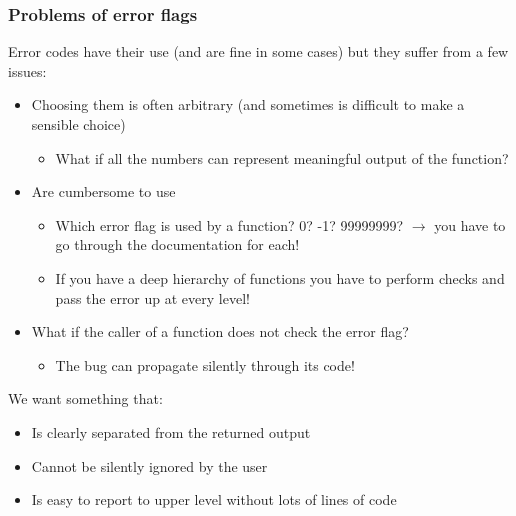 \documentclass[9pt]{beamer}
\begin{document}
\begin{frame}
  \frametitle{Problems of error flags}
  
    Error codes have their use (and are fine in some cases) but they suffer from a few issues:
    \begin{itemize}
      \item Choosing them is often arbitrary (and sometimes is difficult to make a sensible choice)
      \begin{itemize}
        \item What if all the numbers can represent meaningful output of the function?
      \end{itemize}
      \item Are cumbersome to use
      \begin{itemize}
        \item Which error flag is used by a function? 0? -1? 99999999? $\rightarrow$ you have to go through the documentation for each!
        \item If you have a deep hierarchy of functions you have to perform checks and pass the error up at every level!
      \end{itemize}
      \item What if the caller of a function does not check the error flag?
      \begin{itemize}
        \item The bug can propagate \alert{silently} through its code!
      \end{itemize}
    \end{itemize}
   
    \medskip
   
    We want something that:
    \begin{itemize}
      \item Is clearly separated from the returned output
      \item Cannot be silently ignored by the user
      \item Is easy to report to upper level without lots of lines of code
    \end{itemize}
  
\end{frame}
\end{document}
